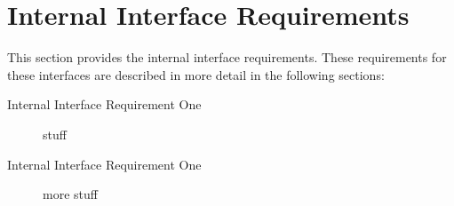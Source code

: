 \KNEADSECTIONNEWPAGE
\section{Internal Interface Requirements}
\label{lab:sec_InternalInterfaceRequirements}



This section provides the internal interface requirements.
These requirements for these interfaces are described in more detail in the following sections:
\begin{description}
	\item[Internal Interface Requirement One] stuff%
	\item[Internal Interface Requirement One] more stuff%
\end{description}



